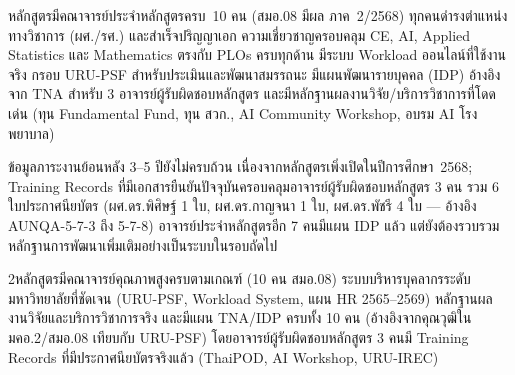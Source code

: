 \begin{strengthbox}
หลักสูตรมีคณาจารย์ประจำหลักสูตรครบ~10 คน (สมอ.08 มีผล ภาค~2/2568) ทุกคนดำรงตำแหน่งทางวิชาการ (ผศ./รศ.) และสำเร็จปริญญาเอก ความเชี่ยวชาญครอบคลุม CE, AI, Applied Statistics และ Mathematics ตรงกับ PLOs ครบทุกด้าน มีระบบ Workload ออนไลน์ที่ใช้งานจริง กรอบ URU-PSF สำหรับประเมินและพัฒนาสมรรถนะ มีแผนพัฒนารายบุคคล (IDP) อ้างอิงจาก TNA สำหรับ 3 อาจารย์ผู้รับผิดชอบหลักสูตร และมีหลักฐานผลงานวิจัย/บริการวิชาการที่โดดเด่น (ทุน Fundamental Fund, ทุน สวก., AI Community Workshop, อบรม AI โรงพยาบาล)
\end{strengthbox}

\begin{weaknessbox}
ข้อมูลภาระงานย้อนหลัง 3--5 ปียังไม่ครบถ้วน เนื่องจากหลักสูตรเพิ่งเปิดในปีการศึกษา~2568; Training Records ที่มีเอกสารยืนยันปัจจุบันครอบคลุมอาจารย์ผู้รับผิดชอบหลักสูตร 3 คน รวม 6 ใบประกาศนียบัตร (ผศ.ดร.พิศิษฐ์ 1 ใบ, ผศ.ดร.กาญจนา 1 ใบ, ผศ.ดร.พัชรี 4 ใบ --- อ้างอิง AUNQA-5-7-3 ถึง 5-7-8) อาจารย์ประจำหลักสูตรอีก 7 คนมีแผน IDP แล้ว แต่ยังต้องรวบรวมหลักฐานการพัฒนาเพิ่มเติมอย่างเป็นระบบในรอบถัดไป
\end{weaknessbox}

\begin{selfassessmentbox}{2}{หลักสูตรมีคณาจารย์คุณภาพสูงครบตามเกณฑ์ (10 คน สมอ.08) ระบบบริหารบุคลากรระดับมหาวิทยาลัยที่ชัดเจน (URU-PSF, Workload System, แผน HR 2565--2569) หลักฐานผลงานวิจัยและบริการวิชาการจริง และมีแผน TNA/IDP ครบทั้ง 10 คน (อ้างอิงจากคุณวุฒิใน มคอ.2/สมอ.08 เทียบกับ URU-PSF) โดยอาจารย์ผู้รับผิดชอบหลักสูตร 3 คนมี Training Records ที่มีประกาศนียบัตรจริงแล้ว (ThaiPOD, AI Workshop, URU-IREC)}
\end{selfassessmentbox}

